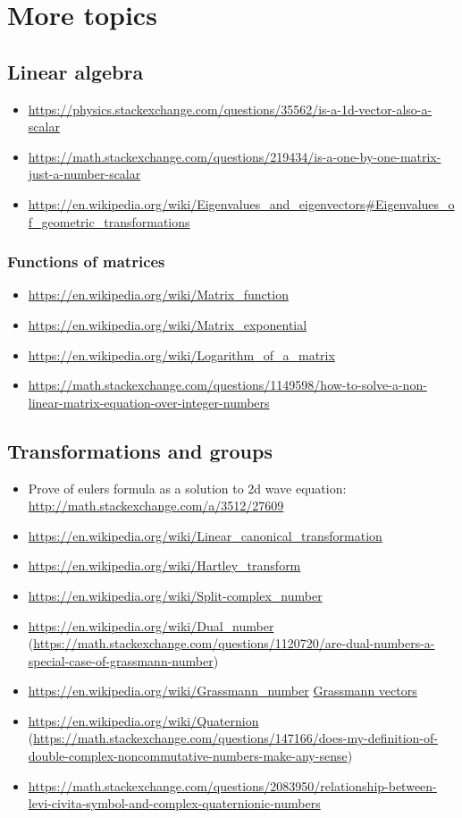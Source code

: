 \section{More topics}
\subsection{Linear algebra}

\begin{itemize}
\item \url{https://physics.stackexchange.com/questions/35562/is-a-1d-vector-also-a-scalar}
\item \url{https://math.stackexchange.com/questions/219434/is-a-one-by-one-matrix-just-a-number-scalar}
\item \url{https://en.wikipedia.org/wiki/Eigenvalues_and_eigenvectors#Eigenvalues_of_geometric_transformations}
\end{itemize}
\subsubsection{Functions of matrices}
\begin{itemize}
\item \url{https://en.wikipedia.org/wiki/Matrix_function}
\item \url{https://en.wikipedia.org/wiki/Matrix_exponential}
\item \url{https://en.wikipedia.org/wiki/Logarithm_of_a_matrix}
\item \url{https://math.stackexchange.com/questions/1149598/how-to-solve-a-non-linear-matrix-equation-over-integer-numbers}
\end{itemize}
\subsection{Transformations and groups}

\begin{itemize}
\item Prove of eulers formula as a solution to 2d wave equation: \url{http://math.stackexchange.com/a/3512/27609}
\item \url{https://en.wikipedia.org/wiki/Linear_canonical_transformation}
\item \url{https://en.wikipedia.org/wiki/Hartley_transform}
\item \url{https://en.wikipedia.org/wiki/Split-complex_number}
\item \url{https://en.wikipedia.org/wiki/Dual_number} (\url{https://math.stackexchange.com/questions/1120720/are-dual-numbers-a-special-case-of-grassmann-number})
\item \url{https://en.wikipedia.org/wiki/Grassmann_number} \href{https://math.stackexchange.com/questions/1108045/relationship-between-levi-civita-symbol-and-grassmann-numbers}{Grassmann vectors}
\item \url{https://en.wikipedia.org/wiki/Quaternion} (\url{https://math.stackexchange.com/questions/147166/does-my-definition-of-double-complex-noncommutative-numbers-make-any-sense})
\item \url{https://math.stackexchange.com/questions/2083950/relationship-between-levi-civita-symbol-and-complex-quaternionic-numbers}
\end{itemize}
